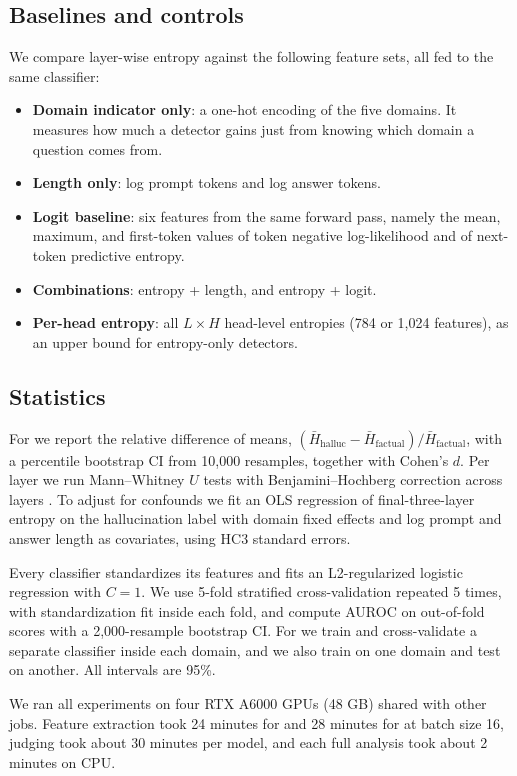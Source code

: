 \subsection{Baselines and controls}

We compare layer-wise entropy against the following feature sets, all fed to the same classifier:
\begin{itemize}[leftmargin=*,itemsep=0pt,topsep=0pt]
    \item \textbf{Domain indicator only}: a one-hot encoding of the five domains. It measures how much a detector gains just from knowing which domain a question comes from.
    \item \textbf{Length only}: log prompt tokens and log answer tokens.
    \item \textbf{Logit baseline}: six features from the same forward pass, namely the mean, maximum, and first-token values of token negative log-likelihood and of next-token predictive entropy.
    \item \textbf{Combinations}: entropy + length, and entropy + logit.
    \item \textbf{Per-head entropy}: all $L \times H$ head-level entropies (784 or 1,024 features), as an upper bound for entropy-only detectors.
\end{itemize}

\subsection{Statistics}

For \Hone we report the relative difference of means, $(\bar{H}_{\text{halluc}} - \bar{H}_{\text{factual}})/\bar{H}_{\text{factual}}$, with a percentile bootstrap CI from 10,000 resamples, together with Cohen's $d$.
Per layer we run Mann--Whitney $U$ tests with Benjamini--Hochberg correction across layers \citep{benjamini1995fdr}.
To adjust for confounds we fit an OLS regression of final-three-layer entropy on the hallucination label with domain fixed effects and log prompt and answer length as covariates, using HC3 standard errors.

Every classifier standardizes its features and fits an L2-regularized logistic regression with $C=1$.
We use 5-fold stratified cross-validation repeated 5 times, with standardization fit inside each fold, and compute AUROC on out-of-fold scores with a 2,000-resample bootstrap CI.
For \Hthree we train and cross-validate a separate classifier inside each domain, and we also train on one domain and test on another.
All intervals are 95\%.

We ran all experiments on four RTX A6000 GPUs (48 GB) shared with other jobs.
Feature extraction took 24 minutes for \qwen and 28 minutes for \llama at batch size 16, judging took about 30 minutes per model, and each full analysis took about 2 minutes on CPU.
